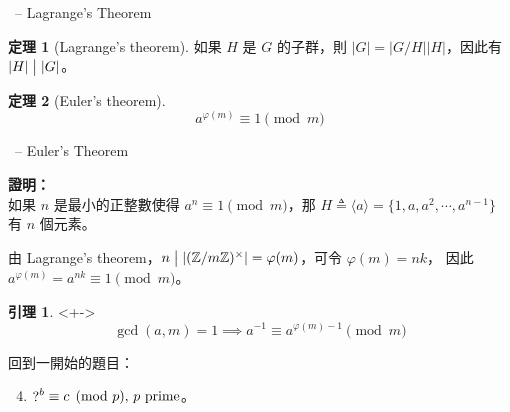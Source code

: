 \documentclass[notheorems,xcolor=dvipsnames]{beamer}
\newcommand\abs[1]{\left\lvert #1 \right\rvert}
\newcommand*{\defeq}{\triangleq}
\newcommand*{\bZ}{\mathbb{Z}}
\theoremstyle{definition}
\newtheorem{theorem}{定理}
\newtheorem{lemma}{引理}
\renewenvironment{proof}{%
\begin{tcolorbox}[frame empty] {\bf 證明：}\ }{\end{tcolorbox}}
\begin{document}
\begin{frame}[t]{\secname \ -- Lagrange's Theorem}
  \begin{theorem}[Lagrange's theorem]
    如果 $H$ 是 $G$ 的子群，則 $\abs{G} = \abs{G / H} \abs{H}$，因此有 $\abs{H} \bigm\vert \abs{G}$。
  \end{theorem}
  \pause

  \bigskip
  \begin{theorem}[Euler's theorem] \vspace{-1em}
    \[ a^{\varphi(m)} \equiv 1 \pmod{m} \]
  \end{theorem}
\end{frame}

\begin{frame}[t]{\secname \ -- Euler's Theorem}
  \begin{proof} \\
    如果 $n$ 是最小的正整數使得 $a^n \equiv 1 \pmod{m}$，那
    $H \defeq \langle a \rangle = \{1, a, a^2, \cdots, a^{n-1}\}$ 有 $n$ 個元素。

    \smallskip
    由 Lagrange's theorem，$n \bigm\vert \abs{(\bZ / m\bZ)^{\times}} = \varphi(m)$，可令 $\varphi(m) = nk$，
    因此 $a^{\varphi(m)} = a^{nk} \equiv 1 \pmod{m}$。
  \end{proof}

  \begin{lemma}<+->
    \vspace{-1em}
    \[ \gcd(a, m) = 1 \implies a^{-1} \equiv a^{\varphi(m)-1} \pmod{m} \]
  \end{lemma}
\end{frame}

\begin{frame}[t]{\secname}
  回到一開始的題目：
  \begin{enumerate}
    \setcounter{enumi}{3}
    \item $\raisebox{-.2mm}{\text{?}}^{b} \equiv c \pmod{p},\, p \text{ prime}$。
  \end{enumerate}

\end{frame}
\end{document}
